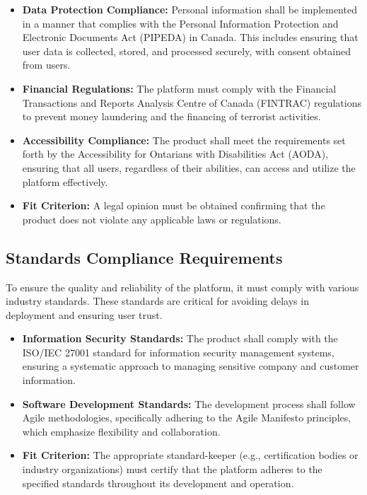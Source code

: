 \documentclass[12pt]{article}
\begin{document}
\begin{itemize}
    \item \textbf{Data Protection Compliance:} Personal information shall be implemented in a manner that complies with the Personal Information Protection and Electronic Documents Act (PIPEDA) in Canada. This includes ensuring that user data is collected, stored, and processed securely, with consent obtained from users.
    \item \textbf{Financial Regulations:} The platform must comply with the Financial Transactions and Reports Analysis Centre of Canada (FINTRAC) regulations to prevent money laundering and the financing of terrorist activities.
    \item \textbf{Accessibility Compliance:} The product shall meet the requirements set forth by the Accessibility for Ontarians with Disabilities Act (AODA), ensuring that all users, regardless of their abilities, can access and utilize the platform effectively.
    \item \textbf{Fit Criterion:} A legal opinion must be obtained confirming that the product does not violate any applicable laws or regulations.
\end{itemize}

\subsection{Standards Compliance Requirements}
To ensure the quality and reliability of the platform, it must comply with various industry standards. These standards are critical for avoiding delays in deployment and ensuring user trust.

\begin{itemize}
    \item \textbf{Information Security Standards:} The product shall comply with the ISO/IEC 27001 standard for information security management systems, ensuring a systematic approach to managing sensitive company and customer information.
    \item \textbf{Software Development Standards:} The development process shall follow Agile methodologies, specifically adhering to the Agile Manifesto principles, which emphasize flexibility and collaboration.
    \item \textbf{Fit Criterion:} The appropriate standard-keeper (e.g., certification bodies or industry organizations) must certify that the platform adheres to the specified standards throughout its development and operation.
\end{itemize}
\end{document}
